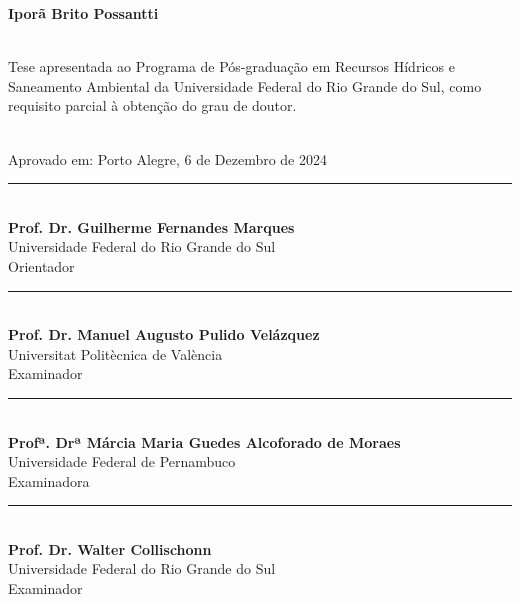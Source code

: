 \documentclass[./main.tex]{subfiles}
\begin{document}
\doublespacing %
\large

\newpage
\renewcommand{\headrulewidth}{0pt}
\thispagestyle{fancy}
\fancyhf{} %
\fancyfoot{} %
\fancyfoot[C]{\thepage}

\begin{center}
        \singlespacing
	\selectfont \textbf{Iporã Brito Possantti}\\	
	\vspace{5mm}
        \selectfont \docTitle\\
	\vspace{5mm}
\end{center}
\begin{adjustwidth}{150pt}{0pt}
    \singlespacing
    \small
    \selectfont Tese apresentada ao Programa de Pós-graduação em Recursos Hídricos e Saneamento Ambiental da Universidade Federal do Rio Grande do Sul, como requisito parcial à obtenção do grau de doutor. \\ \\ 
\end{adjustwidth}
\begin{center}
    \singlespacing
    \selectfont Aprovado em: Porto Alegre, 6 de Dezembro de 2024\\
    \vspace{20mm}
    \rule{0.8\textwidth}{0.4pt} \\[1ex] %
    \selectfont \textbf{Prof. Dr. Guilherme Fernandes Marques} \\
    Universidade Federal do Rio Grande do Sul \\[1ex]
    Orientador \\[5ex]
    \rule{0.8\textwidth}{0.4pt} \\[0.5ex] %
    \selectfont \textbf{Prof. Dr. Manuel Augusto Pulido Velázquez}\\
    Universitat Politècnica de València \\[1ex]
    Examinador \\[5ex]
    \rule{0.8\textwidth}{0.4pt} \\[0.5ex] %
    \selectfont \textbf{Profª. Drª  Márcia Maria Guedes Alcoforado de Moraes}\\
    Universidade Federal de Pernambuco \\[1ex]
    Examinadora \\[5ex]
    \rule{0.8\textwidth}{0.4pt} \\[0.5ex] %
    \selectfont \textbf{Prof. Dr. Walter Collischonn}\\
    Universidade Federal do Rio Grande do Sul \\[1ex]
    Examinador \\[4ex]
	
\end{center}


\clearpage
\end{document}
